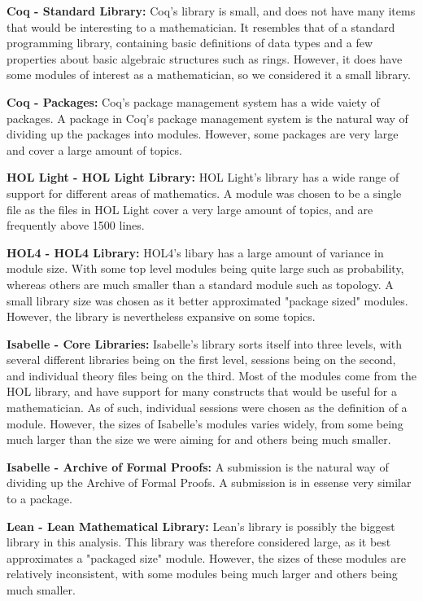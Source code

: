 \documentclass[
]{article}
\begin{document}
\textbf{Coq - Standard Library:} Coq's library is small, and does not
have many items that would be interesting to a mathematician. It
resembles that of a standard programming library, containing basic
definitions of data types and a few properties about basic algebraic
structures such as rings. However, it does have some modules of interest
as a mathematician, so we considered it a small library.

\textbf{Coq - Packages:} Coq's package management system has a wide
vaiety of packages. A package in Coq's package management system is the
natural way of dividing up the packages into modules. However, some
packages are very large and cover a large amount of topics.

\textbf{HOL Light - HOL Light Library:} HOL Light's library has a wide
range of support for different areas of mathematics. A module was chosen
to be a single file as the files in HOL Light cover a very large amount
of topics, and are frequently above 1500 lines.

\textbf{HOL4 - HOL4 Library:} HOL4's libary has a large amount of
variance in module size. With some top level modules being quite large
such as probability, whereas others are much smaller than a standard
module such as topology. A small library size was chosen as it better
approximated "package sized" modules. However, the library is
nevertheless expansive on some topics.

\textbf{Isabelle - Core Libraries:} Isabelle's library sorts itself into
three levels, with several different libraries being on the first level,
sessions being on the second, and individual theory files being on the
third. Most of the modules come from the HOL library, and have support
for many constructs that would be useful for a mathematician. As of
such, individual sessions were chosen as the definition of a module.
However, the sizes of Isabelle's modules varies widely, from some being
much larger than the size we were aiming for and others being much
smaller.

\textbf{Isabelle - Archive of Formal Proofs:} A submission is the
natural way of dividing up the Archive of Formal Proofs. A submission is
in essense very similar to a package.

\textbf{Lean - Lean Mathematical Library:} Lean's library is possibly
the biggest library in this analysis. This library was therefore
considered large, as it best approximates a "packaged size" module.
However, the sizes of these modules are relatively inconsistent, with
some modules being much larger and others being much smaller.
\end{document}
